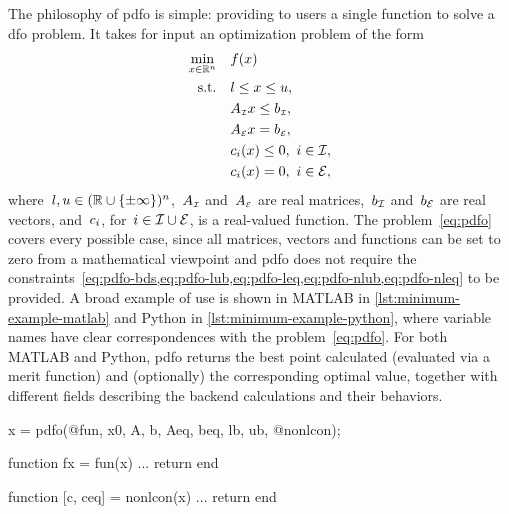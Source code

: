 The philosophy of \gls{pdfo} is simple: providing to users a single function to solve a \gls{dfo} problem.
It takes for input an optimization problem of the form
\begin{subequations}
    \label{eq:pdfo}
    \begin{align}
        \min_{\iter \in \R^n}   & \quad \obj(\iter)\\
        \text{s.t.}             & \quad \xl \le \iter \le \xu, \label{eq:pdfo-bds}\\
                                & \quad A_{\scriptscriptstyle\iub} \iter \le b_{\scriptscriptstyle\iub}, \label{eq:pdfo-lub}\\
                                & \quad A_{\scriptscriptstyle\ieq} \iter = b_{\scriptscriptstyle\ieq}, \label{eq:pdfo-leq}\\
                                & \quad \con{i}(\iter) \le 0, ~ i \in \iub, \label{eq:pdfo-nlub}\\
                                & \quad \con{i}(\iter) = 0, ~ i \in \ieq, \label{eq:pdfo-nleq}
    \end{align}
\end{subequations}
where~$l, u \in (\mathbb{R} \cup \{\pm \infty\})^n$,~$A_{\scriptscriptstyle\mathcal{I}}$ and~$A_{\scriptscriptstyle\mathcal{E}}$ are real matrices,~$b _{\mathcal{I}}$ and~$b _{\mathcal{E}}$ are real vectors, and~$c_{i}$, for~$i \in \mathcal{I} \cup \mathcal{E}$, is a real-valued function.
The problem~\cref{eq:pdfo} covers every possible case, since all matrices, vectors and functions can be set to zero from a mathematical viewpoint and \gls{pdfo} does not require the constraints~\cref{eq:pdfo-bds,eq:pdfo-lub,eq:pdfo-leq,eq:pdfo-nlub,eq:pdfo-nleq} to be provided.
A broad example of use is shown in MATLAB in \cref{lst:minimum-example-matlab} and Python in \cref{lst:minimum-example-python}, where variable names have clear correspondences with the problem~\cref{eq:pdfo}.
For both MATLAB and Python, \gls{pdfo} returns the best point calculated (evaluated via a merit function) and (optionally) the corresponding optimal value, together with different fields describing the backend calculations and their behaviors.

\begin{lstmatlab}[%
    caption=An elementary example of \gls{pdfo} in MATLAB,
    label=lst:minimum-example-matlab,
]
    x = pdfo(@fun, x0, A, b, Aeq, beq, lb, ub, @nonlcon);

    function fx = fun(x)
    ...
    return
    end

    function [c, ceq] = nonlcon(x)
    ...
    return
    end
\end{lstmatlab}

